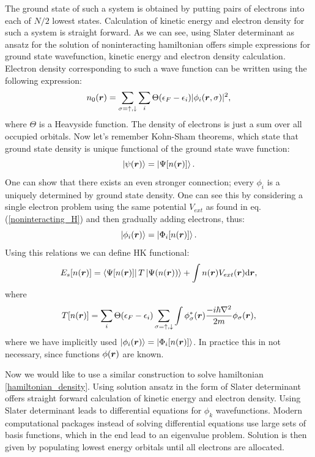\documentclass[openany, longbibliography,slovene,a4paper,12pt]{article}
\def\vec#1{\mbox{\boldmath$#1$}}
\newcommand{\dif}{\mathrm{d}}
\begin{document}
 The ground state of such a system is obtained by putting pairs of electrons
 into each of  $N/2$ lowest states. Calculation of kinetic energy and
 electron density for such a system is straight forward. As we can see,
 using Slater  determinant as ansatz for the solution of noninteracting
 hamiltonian offers simple expressions for ground state wavefunction, kinetic
 energy and electron density  calculation. Electron density corresponding to
 such a wave function can be written using the following expression:
 \begin{equation} \label{KS_density}
   n_0(\vec r) = \sum_{\sigma=\uparrow,\downarrow}\sum_i\Theta(\epsilon_F-\epsilon_i)|\phi_i(\vec r, \sigma)|^2,
 \end{equation}
 where $\Theta$ is a Heavyside function.
 The density of electrons is just a sum over all occupied orbitals. Now let's
 remember Kohn-Sham theorems, which state that ground state density is unique
 functional of the ground state wave function:
 \begin{equation}
   \ket{\psi(\vec r)}= \ket{\Psi[n(\vec r)]}.
 \end{equation}
 One can show that there exists an even stronger connection; every $\phi_i$ is a
 uniquely determined by ground state density. One can see this by considering a single electron problem using the same potential $V_{ext}$ as found in eq.
 (\ref{noninteracting_H}) and then gradually adding electrons, thus:
 \begin{equation}
   \ket{\phi_i(\vec r)}= \ket{\Phi_i[n(\vec r)]}.
 \end{equation}
 Using this relations we can define HK functional:
 \begin{equation}
   E_s[n(\vec r)] = \bra{\Psi[n(\vec r)]}T \ket{\Psi(n(\vec r))} + \int n(\vec r) V_{ext}(\vec r)  \dif \vec r,
   \end{equation}
 where
\begin{equation} \label{KS_kinetic_term}
   T[n(\vec r)] = \sum_i\Theta(\epsilon_F-\epsilon_i)  \sum_{\sigma=\uparrow,\downarrow}\int \phi^*_\sigma(\vec r)\frac{-i\hbar\nabla^2}{2m}\phi_\sigma(\vec r),
 \end{equation}
 where we have implicitly used $\ket{\phi_i(\vec r)} = \ket{ \Phi_i[n(\vec r)] }$.
 In practice this in not necessary, since functions $\phi(\vec r)$ are known.
 
Now we would like to use a similar construction to solve hamiltonian
\ref{hamiltonian_density}. Using solution ansatz in the form of Slater
determinant offers straight forward calculation of kinetic energy and electron
density. Using Slater determinant leads to differential equations for $\phi_k$
wavefunctions. Modern computational packages instead of solving differential
equations use large sets of basis functions, which in the end lead to
an eigenvalue problem. Solution is then given by populating
lowest energy orbitals until all electrons are allocated.
\end{document}
